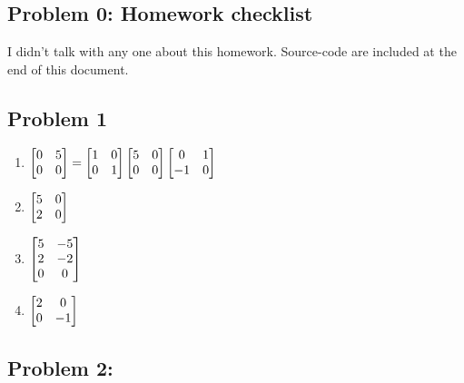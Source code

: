 \documentclass{article}
\begin{document}
 



\hypertarget{problem_0_homework_checklist_2}{}
\subsection*{{Problem 0: Homework checklist}}
\label{problem_0_homework_checklist_2}

\checkmark	I didn't talk with any one about this homework. \newline
\checkmark 	Source-code are included at the end of this document. 

\hypertarget{problem_0_homework_checklist_2}{}
\subsection*{{Problem 1}}
\label{problem_0_homework_checklist_2}

\begin{enumerate}
\item $\begin{bmatrix} 0 & 5 \\ 0 & 0 \end{bmatrix}  = \begin{bmatrix} 1&0\\0&1 \end{bmatrix} \begin{bmatrix} 5&0\\0 &0 \end{bmatrix} \begin{bmatrix} 0&1\\-1 &0 \end{bmatrix}$


\item $\begin{bmatrix} 5 & 0 \\ 2 & 0 \end{bmatrix}$


\item $\begin{bmatrix} 5 & -5 \\ 2 & -2 \\ 0 & 0 \end{bmatrix}$


\item $\begin{bmatrix} 2 & 0 \\ 0 & -1 \end{bmatrix}$

\end{enumerate}



\hypertarget{problem_0_homework_checklist_2}{}
\subsection*{{Problem 2: }}
\label{problem_0_homework_checklist_2}
\end{document}
